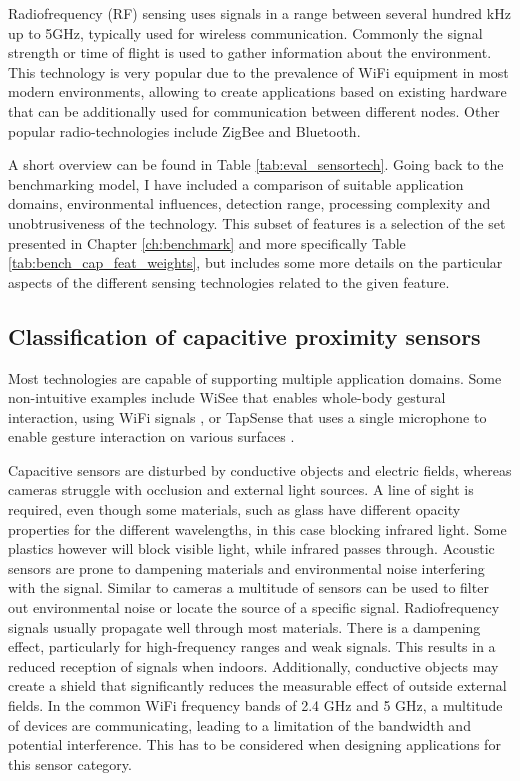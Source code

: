 Radiofrequency (RF) sensing uses signals in a range between several hundred kHz up to 5GHz, typically used for wireless communication. Commonly the signal strength or time of flight is used to gather information about the environment. This technology is very popular due to the prevalence of WiFi equipment in most modern environments, allowing to create applications based on existing hardware that can be additionally used for communication between different nodes. Other popular radio-technologies include ZigBee and Bluetooth.

A short overview can be found in Table \ref{tab:eval_sensortech}. Going back to the benchmarking model, I have included a comparison of suitable application domains, environmental influences, detection range, processing complexity and unobtrusiveness of the technology. This subset of features is a selection of the set presented in Chapter \ref{ch:benchmark} and more specifically Table \ref{tab:bench_cap_feat_weights}, but includes some more details on the particular aspects of the different sensing technologies related to the given feature.

\subsection{Classification of capacitive proximity sensors}
Most technologies are capable of supporting multiple application domains. Some non-intuitive examples include WiSee that enables whole-body gestural interaction, using WiFi signals \cite{pu2013whole}, or TapSense that uses a single microphone to enable gesture interaction on various surfaces \cite{harrison2011tapsense}. 

Capacitive sensors are disturbed by conductive objects and electric fields, whereas cameras struggle with occlusion and external light sources. A line of sight is required, even though some materials, such as glass have different opacity properties for the different wavelengths, in this case blocking infrared light. Some plastics however will block visible light, while infrared passes through. Acoustic sensors are prone to dampening materials and environmental noise interfering with the signal. Similar to cameras a multitude of sensors can be used to filter out environmental noise or locate the source of a specific signal. Radiofrequency signals usually propagate well through most materials. There is a dampening effect, particularly for high-frequency ranges and weak signals. This results in a reduced reception of signals when indoors. Additionally, conductive objects may create a shield that significantly reduces the measurable effect of outside external fields. In the common WiFi frequency bands of 2.4 GHz and 5 GHz, a multitude of devices are communicating, leading to a limitation of the bandwidth and potential interference. This has to be considered when designing applications for this sensor category. 

